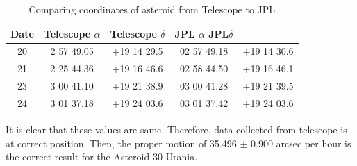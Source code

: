 \documentclass[a4paper,12pt]{article}
\begin{document}
\begin{table}[H]
\centering %
\caption{Comparing coordinates of asteroid from Telescope to JPL}
\footnotesize
\begin{tabular}{ccccc}%
\hline
\hline
Date & Telescope $\alpha$ &Telescope $\delta$&JPL $\alpha$ JPL$\delta$\\
\hline
\hline
20  & 2 57 49.05 & +19 14 29.5 &02 57 49.18 &+19 14 30.6  \\
21   &  2 25 44.36 & +19 16 46.6&02 58 44.50 & +19 16 46.1\\
23  &  3 00 41.10 & +19 21 38.9  &03 00 41.28& +19 21 39.5\\
24 & 3 01 37.18 & +19 24 03.6&03 01 37.42& +19 24 03.6\\
\hline
\hline

\end{tabular}
\label{table:match} %
\end{table}

It is clear that these values are same. Therefore, data collected from telescope is at correct position. Then, the proper motion of 35.496 $\pm$ 0.900 arcsec per hour is the correct result for the Asteroid 30 Urania.


\end{document}
